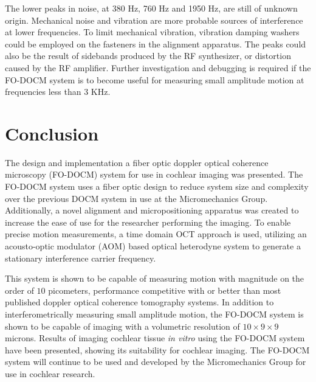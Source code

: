The lower peaks in noise, at 380 Hz, 760 Hz and 1950 Hz, are still of unknown origin. Mechanical noise and vibration are more probable sources of interference at lower frequencies. To limit mechanical vibration, vibration damping washers could be employed on the fasteners in the alignment apparatus. The peaks could also be the result of sidebands produced by the RF synthesizer, or distortion caused by the RF amplifier. Further investigation and debugging is required if the FO-DOCM system is to become useful for measuring small amplitude motion at frequencies less than 3 KHz.


\section{Conclusion}

The design and implementation a fiber optic doppler optical coherence microscopy (FO-DOCM) system for use in cochlear imaging was presented. The FO-DOCM system uses a fiber optic design to reduce system size and complexity over the previous DOCM system in use at the Micromechanics Group. Additionally, a novel alignment and micropositioning apparatus was created to increase the ease of use for the researcher performing the imaging. To enable precise motion measurements, a time domain OCT approach is used, utilizing an acousto-optic modulator (AOM) based optical heterodyne system to generate a stationary interference carrier frequency.

This system is shown to be capable of measuring motion with magnitude on the order of $10$ picometers, performance competitive with or better than most published doppler optical coherence tomography systems. In addition to interferometrically measuring small amplitude motion, the FO-DOCM system is shown to be capable of imaging with a volumetric resolution of $10 \times 9 \times 9$ microns. Results of imaging cochlear tissue {\em in vitro} using the FO-DOCM system have been presented, showing its suitability for cochlear imaging. The FO-DOCM system will continue to be used and developed by the Micromechanics Group for use in cochlear research.
